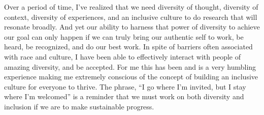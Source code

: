 \documentclass[a4paper, 12pt]{article}
\begin{document}
Over a period of time, I've realized that we need diversity of thought, diversity of context, diversity of experiences, and an inclusive culture to do research that will resonate broadly. And yet our ability to harness that power of diversity to achieve our goal can only happen if we can truly bring our authentic self to work, be heard, be recognized, and do our best work. In spite of barriers often associated with race and culture, I have been able to effectively interact with people of amazing diversity, and be accepted. For me this has been and is a very humbling experience making me extremely conscious of the concept of building an inclusive culture for everyone to thrive. The phrase, \enquote{I go where I’m invited, but I stay where I’m welcomed} is a reminder that we must work on both diversity and inclusion if we are to make sustainable progress. 
\end{document}
